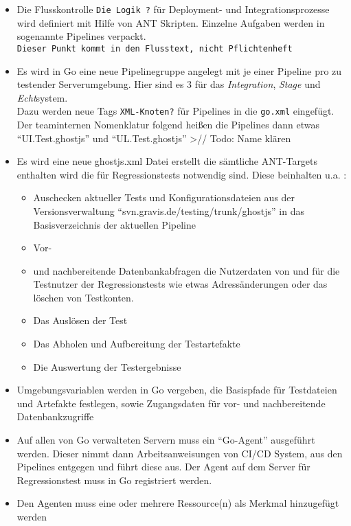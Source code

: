 \begin{itemize}
\item
  Die Flusskontrolle \texttt{Die\ Logik\ ?} für Deployment- und
  Integrationsprozesse wird definiert mit Hilfe von ANT Skripten.
  Einzelne Aufgaben werden in sogenannte Pipelines verpackt.
  \texttt{Dieser\ Punkt\ kommt\ in\ den\ Flusstext,\ nicht\ Pflichtenheft}
\item
  Es wird in Go eine neue Pipelinegruppe angelegt mit je einer Pipeline
  pro zu testender Serverumgebung. Hier sind es 3 für das
  \emph{Integration}, \emph{Stage} und \emph{Echt}‌system.\\ Dazu werden
  neue Tags \texttt{XML-Knoten?} für Pipelines in die \texttt{go.xml}
  eingefügt. Der teaminternen Nomenklatur folgend heißen die Pipelines
  dann etwas ``UI.Test.ghostjs'' und ``UL.Test.ghostjs''
  \textgreater{}// Todo: Name klären
\item
  Es wird eine neue ghostjs.xml Datei erstellt die sämtliche ANT-Targets
  enthalten wird die für Regressionstests notwendig sind. Diese
  beinhalten u.a. :

  \begin{itemize}
  \itemsep1pt\parskip0pt
  \item
    Auschecken aktueller Tests und Konfigurationsdateien aus der
    Versionsverwaltung ``svn.gravis.de/testing/trunk/ghostjs'' in das
    Basisverzeichnis der aktuellen Pipeline
  \item
    Vor-
  \item
    und nachbereitende Datenbankabfragen die Nutzerdaten von und für die
    Testnutzer der Regressionstests wie etwas Adressänderungen oder das
    löschen von Testkonten.
  \item
    Das Auslösen der Test
  \item
    Das Abholen und Aufbereitung der Testartefakte
  \item
    Die Auswertung der Testergebnisse
  \end{itemize}
\item
  Umgebungsvariablen werden in Go vergeben, die Basispfade für
  Testdateien und Artefakte festlegen, sowie Zugangsdaten für vor- und
  nachbereitende Datenbankzugriffe
\item
  Auf allen von Go verwalteten Servern muss ein ``Go-Agent'' ausgeführt
  werden. Dieser nimmt dann Arbeitsanweisungen von CI/CD System, aus den
  Pipelines entgegen und führt diese aus. Der Agent auf dem Server für
  Regressionstest muss in Go registriert werden.
\item
  Den Agenten muss eine oder mehrere Ressource(n) als Merkmal
  hinzugefügt werden


\end{itemize}
